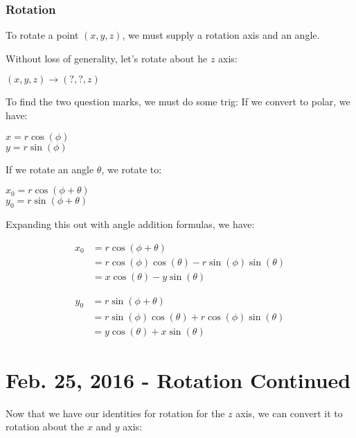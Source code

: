 \documentclass[11pt,fleqn]{article}
\theoremstyle{definition}
\begin{document}
\subsubsection{Rotation}

To rotate a point $(x,y,z)$, we must supply a rotation axis and an angle.

Without loss of generality, let's rotate about he $z$ axis:

\begin{center}
    $(x,y,z) \rightarrow (?, ?, z)$
\end{center}

To find the two question marks, we must do some trig:
If we convert to polar, we have:
\begin{center}
    $x = r\cos(\phi)$ \\
    $y = r\sin(\phi)$
\end{center}

If we rotate an angle $\theta$, we rotate to:
\begin{center}
    $x_0 = r\cos(\phi + \theta)$ \\
    $y_0 = r\sin(\phi + \theta)$
\end{center}

Expanding this out with angle addition formulas, we have:

\begin{align*}
    x_0 &= r\cos(\phi + \theta) \\
        &= r\cos(\phi)\cos(\theta) - r\sin(\phi)\sin(\theta) \\
        &= x\cos(\theta) - y\sin(\theta)
\end{align*}

\begin{align*}
    y_0 &= r\sin(\phi + \theta) \\
        &= r\sin(\phi)\cos(\theta) + r\cos(\phi)\sin(\theta) \\
        &= y\cos(\theta) + x\sin(\theta)
\end{align*}

\section{Feb. 25, 2016 - Rotation Continued}

Now that we have our identities for rotation for the $z$ axis, we can convert it to
rotation about the $x$ and $y$ axis:
\end{document}
